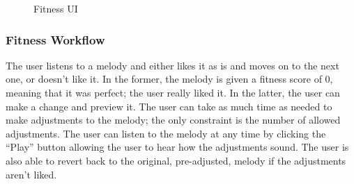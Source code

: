 \documentclass[12pt]{article} %
\begin{document}
\begin{figure}[H]
\caption{Fitness UI}
\label{fig:fitness_ui}
\end{figure}

\subsubsection{Fitness Workflow}
The user listens to a melody and either likes it as is and moves on to the next one, or doesn't like it. In the former, the melody is given a fitness score of 0, meaning that it was perfect; the user really liked it. In the latter, the user can make a change and preview it. The user can take as much time as needed to make adjustments to the melody; the only constraint is the number of allowed adjustments. The user can listen to the melody at any time by clicking the “Play” button allowing the user to hear how the adjustments sound. The user is also able to revert back to the original, pre-adjusted, melody if the adjustments aren't liked. 
\end{document}
